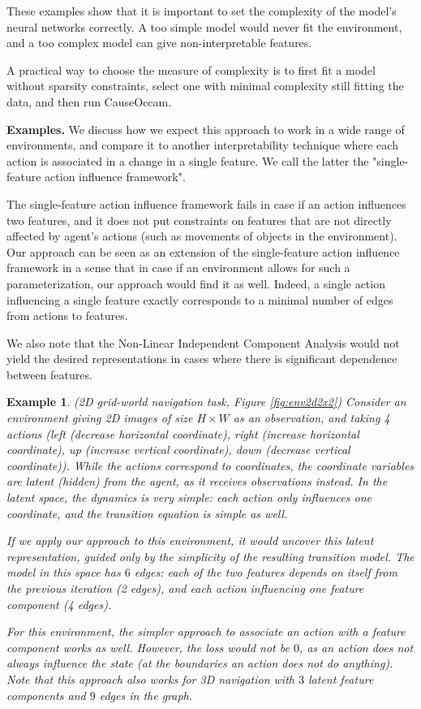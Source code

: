 \documentclass[a4paper,11pt,oneside]{report}
\newtheorem{example}{Example}[section]
\newcommand{\sysname}{CauseOccam\xspace}
\begin{document}
These examples show that it is important to set the complexity of the model's neural networks correctly. A too simple model would never fit the environment, and a too complex model can give non-interpretable features.

A practical way to choose the measure of complexity is to first fit a model without sparsity constraints, select one with minimal complexity still fitting the data, and then run \sysname.

{\bf Examples.} We discuss how we expect this approach to work in a wide range of environments, and compare it to another interpretability technique where each action is associated in a change in a single feature. We call the latter the "single-feature action influence framework".

The single-feature action influence framework fails in case if an action influences two features, and it does not put constraints on features that are not directly affected by agent's actions (such as movements of objects in the environment). Our approach can be seen as an extension of the single-feature action influence framework in a sense that in case if an environment allows for such a parameterization, our approach would find it as well. Indeed, a single action influencing a single feature exactly corresponds to a minimal number of edges from actions to features.

We also note that the Non-Linear Independent Component Analysis\cite{Dinh2015} would not yield the desired representations in cases where there is significant dependence between features.


\begin{example}{(2D grid-world navigation task, Figure \ref{fig:env2d2x2})}
    Consider an environment giving 2D images of size $H\times W$ as an observation, and taking 4 actions (left (decrease horizontal coordinate), right (increase horizontal coordinate), up (increase vertical coordinate), down (decrease vertical coordinate)). While the actions correspond to coordinates, the coordinate variables are latent (hidden) from the agent, as it receives observations instead. In the latent space, the dynamics is very simple: each action only influences one coordinate, and the transition equation is simple as well.

    If we apply our approach to this environment, it would uncover this latent representation, guided only by the simplicity of the resulting transition model.
    The model in this space has $6$ edges: each of the two features depends on itself from the previous iteration (2 edges), and each action influencing one feature component (4 edges).

    For this environment, the simpler approach to associate an action with a feature component works as well. However, the loss would not be $0$, as an action does not always influence the state (at the boundaries an action does not do anything). Note that this approach also works for 3D navigation with $3$ latent feature components and $9$ edges in the graph.
\end{example}
\end{document}
